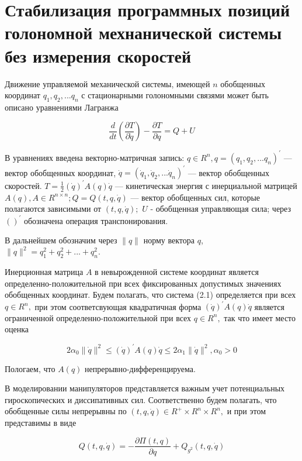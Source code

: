 \section{Стабилизация программных позиций голономной мехнанической системы без измерения скоростей} \label{p12}

Движение управляемой механической системы, имеющей $n$ обобщенных координат $q_1, q_2, ... q_n$ с стационарными голономными связями может быть описано уравнениями Лагранжа 

\begin{equation}
\frac{d}{dt} (\frac{\partial T}{\partial \dot q}) - \frac{\partial T}{\partial q} = Q + U
\end{equation}

 В уравнениях введена векторно-матричная запись: $q \in R^n, q = (q_1, q_2, ... q_n)^{'}$ --- вектор обобщенных координат, $\dot q = (\dot q_1, \dot q_2, ... \dot q_n)^{'}$ --- вектор обобщенных скоростей. $T = \frac{1}{2} (\dot q)^{'} A(q) \dot q$ --- кинетическая энергия с инерциальной матрицей $A(q), A \in R^{n \times n};  Q = Q(t, q, \dot q)$ --- вектор обобщенных сил, которые полагаются зависимыми от $(t, q, \dot q);$ $U$ - обобщенная управляющая сила; через $( )^{'}$ обозначена операция транспонирования. 

В дальнейшем обозначим через $\| q \|$ норму вектора $q$, $\|q\|^{2} = q_1^2 + q_2^2 + ... + q_n^2.$

Инерционная матрица $A$ в невырожденной системе координат является определенно-положительной при всех фиксированных допустимых значениях обобщенных координат. Будем полагать, что система (2.1) определяется при всех $q \in R^n,$ при этом соответсвующая квадратичная форма $(\dot q)^{'} A(q) \dot q$ является ограниченной определенно-положительной при всех $q \in R^n,$ так что имеет место оценка 

\begin{equation}
2 \alpha_0 \| \dot q \|^2 \le (\dot q)^{'} A(q) \dot q \le 2 \alpha_1 \| \dot q \|^2, \alpha_0 > 0
\end{equation}

Пологаем, что $A(q)$ непрерывно-дифференцируема.

В моделировании манипуляторов представляется важным учет потенциальных гироскопических и диссипативных сил. Соответственно будем полагать, что обобщенные силы непрерывны по $(t, q, \dot q) \in R^{+} \times R^{n} \times R^{n},$ и при этом представимы в виде

\begin{equation}
Q(t, q, \dot q) = -\frac{\partial \Pi (t, q)}{\partial q} + Q_{g^2} (t, q, \dot q)
\end{equation}

